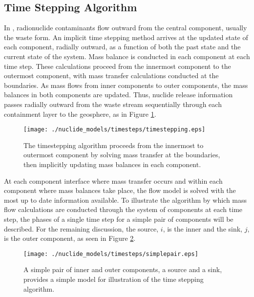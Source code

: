 \subsection{Time Stepping Algorithm}\label{sec:time stepping}

In \Cyder, radionuclide contaminants flow outward from the central component, 
usually the waste form. An implicit time stepping method arrives at the updated 
state of each component, radially outward, as a function of both the past state 
and the current state of the system. Mass balance is conducted in each 
component at each time step. These calculations proceed from the innermost 
component to the outermost component, with mass transfer calculations conducted 
at the boundaries. As mass flows from inner components to outer components, the 
mass balances in both components are updated.  Thus, nuclide release 
information passes radially outward from the waste stream sequentially through 
each containment layer to the geosphere, as in Figure \ref{fig:timesteps}.

\begin{figure}[htbp]
\begin{center}
\texttt{[image: ./nuclide\_models/timesteps/timestepping.eps]}
\end{center}
\caption{The \Cyder timestepping algorithm proceeds from the innermost to 
outermost component by solving mass transfer at the boundaries, then implicitly 
updating mass balances in each component.}
\label{fig:timesteps}
\end{figure}

At each component interface where mass transfer occurs and within each component 
where mass balances take place, the flow model is solved with the most up to 
date information available.  To illustrate the algorithm by which mass flow 
calculations are conducted through the system of components at each time step, 
the phases of a single time step for a simple pair of components will be 
described. For the remaining discussion, the source, $i$, is the inner and the 
sink, $j$, is the outer component, as seen in Figure \ref{fig:simplepair}.

\begin{figure}[htbp]
\begin{center}
\texttt{[image: ./nuclide\_models/timesteps/simplepair.eps]}
\end{center}
\caption{A simple pair of inner and outer components, a source and a sink, 
provides a simple model for illustration of the time stepping algorithm.}
\label{fig:simplepair}
\end{figure}

